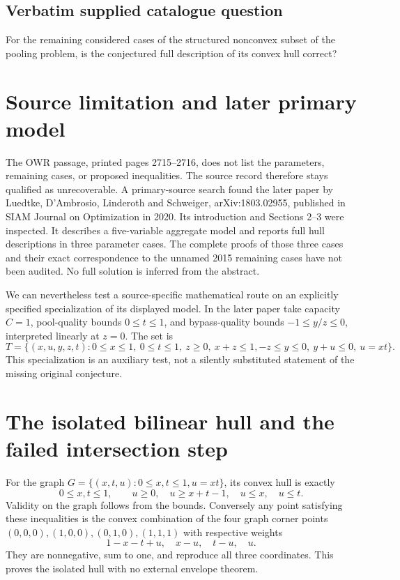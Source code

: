 \documentclass[11pt]{article}
\begin{document}
\subsection{Verbatim supplied catalogue question}
For the remaining considered cases of the structured nonconvex subset of the pooling problem, is the conjectured full description of its convex hull correct?

\section{Source limitation and later primary model}
The OWR passage, printed pages 2715--2716, does not list the parameters,
remaining cases, or proposed inequalities. The source record therefore stays
qualified as unrecoverable. A primary-source search found the later paper by
Luedtke, D'Ambrosio, Linderoth and Schweiger, arXiv:1803.02955, published in
SIAM Journal on Optimization in 2020. Its introduction and Sections 2--3
were inspected. It describes a five-variable aggregate model and reports
full hull descriptions in three parameter cases. The complete proofs of those
three cases and their exact correspondence to the unnamed 2015 remaining
cases have not been audited. No full solution is inferred from the abstract.

We can nevertheless test a source-specific mathematical route on an explicitly
specified specialization of its displayed model. In the later paper take
capacity $C=1$, pool-quality bounds $0\le t\le1$, and bypass-quality bounds
$-1\le y/z\le0$, interpreted linearly at $z=0$. The set is
\[
T=\{(x,u,y,z,t):0\le x\le1,\ 0\le t\le1,\ z\ge0,\ x+z\le1,
-z\le y\le0,\ y+u\le0,\ u=xt\}.
\]
This specialization is an auxiliary test, not a silently substituted statement
of the missing original conjecture.

\section{The isolated bilinear hull and the failed intersection step}
For the graph $G=\{(x,t,u):0\le x,t\le1,u=xt\}$, its convex hull is exactly
\[
0\le x,t\le1,\qquad
u\ge0,\quad u\ge x+t-1,\quad u\le x,\quad u\le t.
\]
Validity on the graph follows from the bounds. Conversely any point satisfying
these inequalities is the convex combination of the four graph corner points
$(0,0,0),(1,0,0),(0,1,0),(1,1,1)$ with respective weights
\[
1-x-t+u,\quad x-u,\quad t-u,\quad u.
\]
They are nonnegative, sum to one, and reproduce all three coordinates.
This proves the isolated hull with no external envelope theorem.
\end{document}
